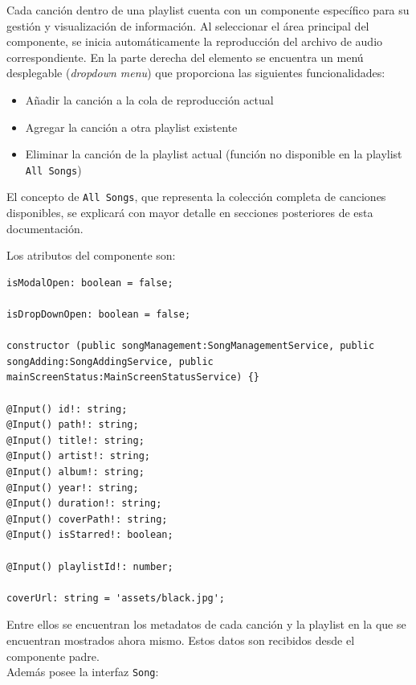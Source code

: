 \documentclass[11pt, a4paper]{article}
\begin{document}
                Cada canción dentro de una playlist cuenta con un componente específico para su gestión y visualización de información. Al seleccionar el área principal del componente, se inicia automáticamente la reproducción del archivo de audio correspondiente. En la parte derecha del elemento se encuentra un menú desplegable (\textit{dropdown menu}) que proporciona las siguientes funcionalidades:

                \begin{itemize}
                    \item Añadir la canción a la cola de reproducción actual
                    \item Agregar la canción a otra playlist existente
                    \item Eliminar la canción de la playlist actual (función no disponible en la playlist \texttt{All Songs})
                \end{itemize}

                El concepto de \texttt{All Songs}, que representa la colección completa de canciones disponibles, se explicará con mayor detalle en secciones posteriores de esta documentación.

                Los atributos del componente son:

                \begin{lstlisting}[caption={Atributos Song Button}]
isModalOpen: boolean = false;

isDropDownOpen: boolean = false;

constructor (public songManagement:SongManagementService, public songAdding:SongAddingService, public mainScreenStatus:MainScreenStatusService) {}

@Input() id!: string;
@Input() path!: string;
@Input() title!: string;
@Input() artist!: string;
@Input() album!: string;
@Input() year!: string;
@Input() duration!: string;
@Input() coverPath!: string;
@Input() isStarred!: boolean;

@Input() playlistId!: number;

coverUrl: string = 'assets/black.jpg';
                \end{lstlisting}

                Entre ellos se encuentran los metadatos de cada canción y la playlist en la que se encuentran mostrados ahora mismo. Estos datos son recibidos desde el componente padre. \\

                Además posee la interfaz \texttt{Song}:
\end{document}
